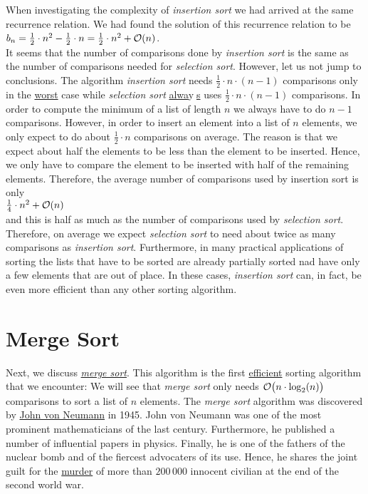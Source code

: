 When investigating the complexity of \emph{insertion sort} we had arrived at the same recurrence
relation. We had found the solution of this recurrence relation to be
\\[0.2cm]
\hspace*{1.3cm} $b_n = \frac{1}{2} \cdot n^2 - \frac{1}{2}\cdot n = \frac{1}{2} \cdot n^2 +
\mathcal{O}(n)$. 
\\[0.2cm]
It seems that the number of comparisons done by \emph{insertion sort} is the same as the number of
comparisons needed for \emph{selection sort}.  However, let us not jump to conclusions.
The algorithm \emph{insertion sort} needs
$\frac{1}{2}\cdot n \cdot (n-1)$ comparisons only in the \underline{worst} case while \emph{selection sort}
\underline{alwa}y$\!\!$\underline{$\;$s} uses $\frac{1}{2} \cdot n\cdot(n-1)$ comparisons.
In order to compute the minimum of a list of length $n$ we always have to do $n-1$ comparisons.
However, in order to insert an element into a list of $n$ elements, we only expect to do about
$\frac{1}{2} \cdot n$ comparisons on average.  The reason is that we expect about half the elements  to
be less than the element to be inserted.  Hence, we only have to compare the element to be inserted
with half of the remaining elements.  Therefore, the average number of comparisons used by
insertion sort is only
\\[0.2cm]
\hspace*{1.3cm}
 $\frac{1}{4} \cdot n^2 + \mathcal{O}(n)$
\\[0.2cm]
and this is half as much as the number of comparisons used by \emph{selection sort}.  Therefore, on
average we expect \emph{selection sort} to need about twice as many comparisons as \emph{insertion sort}.
Furthermore,  in many practical applications of sorting the lists that have to be sorted are already
partially sorted nad have only a few elements that are out of place.  In these cases,
\emph{insertion sort} can, in fact, be even more efficient than any other sorting algorithm.


\section{Merge Sort}
Next, we discuss \href{http://en.wikipedia.org/wiki/Merge_sort}{\emph{merge sort}}.  This algorithm
is the first \underline{efficient} sorting algorithm that we encounter: We will see that \emph{merge sort} 
only needs $\mathcal{O}\bigl(n \cdot \log_2(n)\bigr)$ comparisons to sort a list of $n$ elements.  
The \emph{merge sort} algorithm was discovered by
\href{http://en.wikipedia.org/wiki/John_von_Neumann}{John von Neumann} in 1945.  John von Neumann 
was one of the most prominent mathematicians of the last century.  Furthermore, he published a
number of influential papers in physics.  Finally, he is one of the fathers of the nuclear bomb and
of the fiercest advocaters of its use.  Hence, he shares the joint guilt for the 
\href{http://en.wikipedia.org/wiki/Atomic_bombings_of_Hiroshima_and_Nagasaki}{murder} of more than
$200\,000$ innocent civilian at the end of the second world war.


